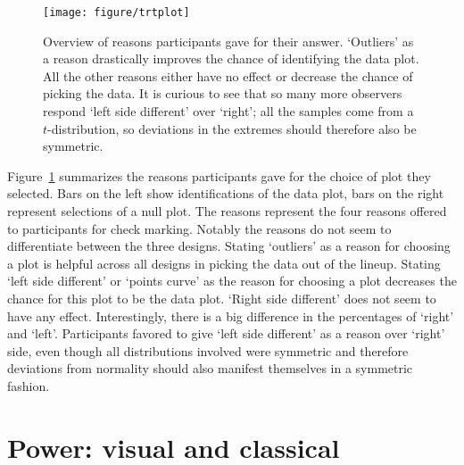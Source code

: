 \documentclass{article}\usepackage[]{graphicx}\usepackage[]{color}
\newenvironment{knitrout}{}{} %
\newcommand{\hh}[1]{{\color{magenta} #1}}
\newcommand{\hhnote}[1]{\todo[inline,color=magenta!40]{#1}}
\begin{document}
\begin{figure}[hbt]
\centering
\begin{knitrout}
\color{fgcolor}
\texttt{[image: figure/trtplot]} 

\end{knitrout}
\caption{\label{fig:choices}Overview of reasons participants gave for  their answer. `Outliers' as a reason drastically improves the chance of identifying the data plot. All the other reasons either have no effect or decrease the chance of picking the data. It is curious to see that so many more observers respond `left side different' over `right';  all the samples  come from a  $t$-distribution, so deviations in the extremes should therefore also be symmetric.}
\end{figure}

\hh{Figure~\ref{fig:choices} summarizes the reasons participants gave for the choice of plot they selected. Bars on the left show  identifications of the data plot, bars on the right represent selections of a null plot. The reasons represent the four reasons offered  to participants for check marking. Notably the reasons do not seem to differentiate between the three designs. Stating `outliers' as a reason for choosing a plot is helpful across all designs in picking the data out of the lineup. Stating `left side different' or `points curve'  as the reason for choosing a plot decreases the chance for this plot to be the data plot. `Right side different' does not seem to have any effect. Interestingly, there is a big difference in the percentages of `right' and `left'. Participants favored to give `left side different' as a reason over `right' side, even though all distributions involved were symmetric and therefore deviations from normality should also manifest themselves in a symmetric fashion.}


\section{Power: visual and classical}\label{sec:power2}
\end{document}
